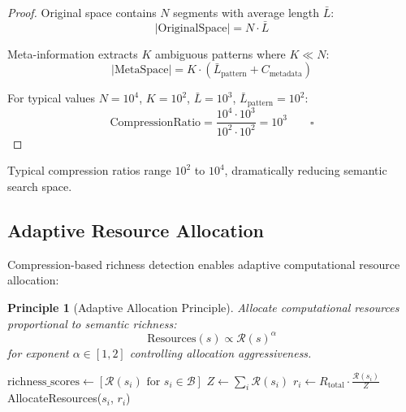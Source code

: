\documentclass[12pt,a4paper]{article}
\newtheorem{principle}{Principle}
\begin{document}
\begin{proof}
Original space contains $N$ segments with average length $\bar{L}$:
\begin{equation}
|\text{OriginalSpace}| = N \cdot \bar{L}
\end{equation}

Meta-information extracts $K$ ambiguous patterns where $K \ll N$:
\begin{equation}
|\text{MetaSpace}| = K \cdot (\bar{L}_{\text{pattern}} + C_{\text{metadata}})
\end{equation}

For typical values $N = 10^4$, $K = 10^2$, $\bar{L} = 10^3$, $\bar{L}_{\text{pattern}} = 10^2$:
\begin{equation}
\text{CompressionRatio} = \frac{10^4 \cdot 10^3}{10^2 \cdot 10^2} = 10^3 \qquad \square
\end{equation}
\end{proof}

Typical compression ratios range $10^2$ to $10^4$, dramatically reducing semantic search space.

\subsection{Adaptive Resource Allocation}

Compression-based richness detection enables adaptive computational resource allocation:

\begin{principle}[Adaptive Allocation Principle]
Allocate computational resources proportional to semantic richness:
\begin{equation}
\text{Resources}(s) \propto \mathcal{R}(s)^{\alpha}
\end{equation}
for exponent $\alpha \in [1, 2]$ controlling allocation aggressiveness.
\end{principle}

\begin{algorithm}[H]
\caption{Adaptive Resource Allocation}
\begin{algorithmic}[1]
\State $\text{richness\_scores} \leftarrow [\mathcal{R}(s_i) \text{ for } s_i \in \mathcal{B}]$
\State $Z \leftarrow \sum_i \mathcal{R}(s_i)$ 
    \State $r_i \leftarrow R_{\text{total}} \cdot \frac{\mathcal{R}(s_i)}{Z}$ 
    \State AllocateResources($s_i$, $r_i$)
\EndFor
\EndProcedure
\end{algorithmic}
\end{algorithm}
\end{document}
